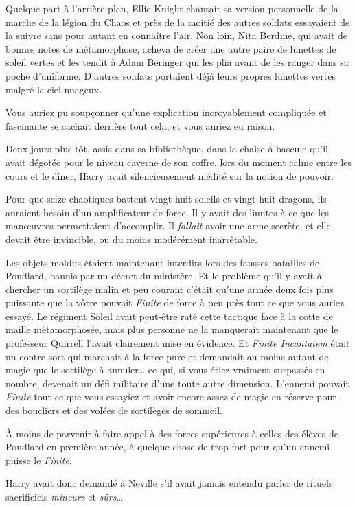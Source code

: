 Quelque part à l'arrière-plan, Ellie Knight chantait sa version personnelle de la marche de la légion du Chaos et près de la moitié des autres soldats essayaient de la suivre sans pour autant en connaître l'air. Non loin, Nita Berdine, qui avait de bonnes notes de métamorphose, acheva de créer une autre paire de lunettes de soleil vertes et les tendit à Adam Beringer qui les plia avant de les ranger dans sa poche d'uniforme. D'autres soldats portaient déjà leurs propres lunettes vertes malgré le ciel nuageux.

Vous auriez pu soupçonner qu'une explication incroyablement compliquée et fascinante se cachait derrière tout cela, et vous auriez eu raison.

Deux jours plus tôt, assis dans sa bibliothèque, dans la chaise à bascule qu'il avait dégotée pour le niveau caverne de son coffre, lors du moment calme entre les cours et le dîner, Harry avait silencieusement médité sur la notion de pouvoir.

Pour que seize chaotiques battent vingt-huit soleils et vingt-huit dragons, ils auraient besoin d'un amplificateur de force. Il y avait des limites à ce que les manœuvres permettaient d'accomplir. Il \emph{fallait} avoir une arme secrète, et elle devait être invincible, ou du moins modérément inarrêtable.

Les objets moldus étaient maintenant interdits lors des fausses batailles de Poudlard, bannis par un décret du ministère. Et le problème qu'il y avait à chercher un sortilège malin et peu courant c'était qu'une armée deux fois plus puissante que la vôtre pouvait \emph{Finite} de force à peu près tout ce que vous auriez essayé. Le régiment Soleil avait peut-être raté cette tactique face à la cotte de maille métamorphosée, mais plus personne ne la manquerait maintenant que le professeur Quirrell l'avait clairement mise en évidence. Et \emph{Finite Incantatem} était un contre-sort qui marchait à la force pure et demandait au moins autant de magie que le sortilège à annuler… ce qui, si vous étiez vraiment surpassés en nombre, devenait un défi militaire d'une toute autre dimension. L'ennemi pouvait \emph{Finite} tout ce que vous essayiez et avoir encore assez de magie en réserve pour des boucliers et des volées de sortilèges de sommeil.

À moins de parvenir à faire appel à des forces supérieures à celles des élèves de Poudlard en première année, à quelque chose de trop fort pour qu'un ennemi puisse le \emph{Finite}.

Harry avait donc demandé à Neville s'il avait jamais entendu parler de rituels sacrificiels \emph{mineurs} et \emph{sûrs}…

